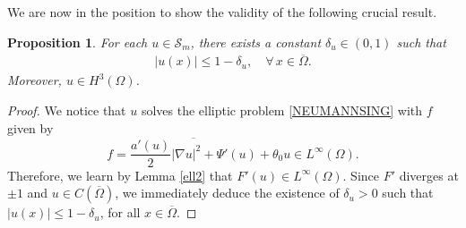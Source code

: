 \documentclass[11pt,reqno]{amsart}
\newtheorem{proposition}[theorem]{Proposition}
\theoremstyle{remark}
\def\u{u}
\numberwithin{equation}{section}
\begin{document}
We are now in the position to show the validity of the following crucial result.
\begin{proposition}\label{esci}
For each $\u\in \mathcal{S}_m$, there exists a constant $\delta_u \in (0,1)$ such that
 \begin{align}
 |\u(x)|\leq 1-\delta_u, \quad \forall\, x\in \overline{\Omega}.\label{sepsta}
 \end{align}
 Moreover, $\u\in H^3(\Omega)$.
 \end{proposition}

\begin{proof}
We notice that $\u$ solves the elliptic problem \eqref{NEUMANNSING} with $f$ given by
$$f=\overline{\frac{a'(\u)}{2} |\nabla \u|^2+\Psi'(\u)}+\theta_0 \u\in L^\infty(\Omega).$$
Therefore,  we learn by Lemma \ref{ell2} that $F'(\u)\in L^\infty(\Omega)$. Since $F'$ diverges at $\pm 1$ and
$\u\in C(\overline{\Omega})$, we immediately deduce the existence of $\delta_u>0$ such that
$|\u(x)|\leq 1-\delta_u$, for all $x\in \overline{\Omega}$.


\end{proof}
\end{document}
